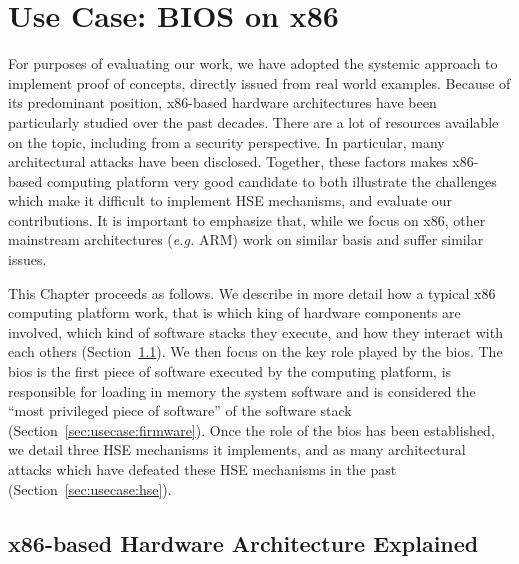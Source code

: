 \chapter{Use Case: BIOS on x86}
\label{chapter:usecase}


For purposes of evaluating our work, we have adopted the systemic approach to
implement proof of concepts, directly issued from real world examples.
%
Because of its predominant position, x86-based hardware architectures have been
particularly studied over the past decades.
%
There are a lot of resources available on the topic, including from a security
perspective.
%
In particular, many architectural attacks have been disclosed.
%
Together, these factors makes x86-based computing platform very good candidate
to both illustrate the challenges which make it difficult to implement HSE
mechanisms, and evaluate our contributions.
%
It is important to emphasize that, while we focus on x86, other mainstream
architectures (\emph{e.g.} ARM) work on similar basis and suffer similar issues.

This Chapter proceeds as follows.
%
We describe in more detail how a typical x86 computing platform work, that is
which king of hardware components are involved, which kind of software stacks
they execute, and how they interact with each others
(Section~\ref{sec:usecase:architecture}).
%
We then focus on the key role played by the \ac{bios}.
%
The \ac{bios} is the first piece of software executed by the computing platform,
is responsible for loading in memory the system software and is considered the
``most privileged piece of software'' of the software stack
(Section~\ref{sec:usecase:firmware}).
%
Once the role of the \ac{bios} has been established, we detail three HSE
mechanisms it implements, and as many architectural attacks which have defeated
these HSE mechanisms in the past (Section~\ref{sec:usecase:hse}).

\section{x86-based Hardware Architecture Explained}
\label{sec:usecase:architecture}

